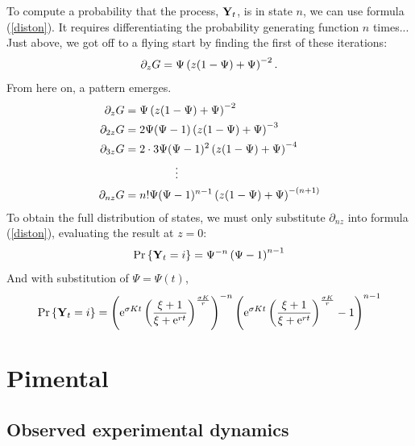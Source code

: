 To compute a probability that the process, ${{\bf Y}_t}$, is in state $n$, we can use formula (\ref{diston}). It requires differentiating the probability generating function $n$ times... Just above, we got off to a flying start by finding the first of these iterations:
$$\partial_z G = \Psi \left( z(1-\Psi) + \Psi\right)^{-2}.$$
From here on, a pattern emerges.
\begin{align*}
\partial_z G &= \Psi \left( z(1-\Psi) + \Psi\right)^{-2}\\
\partial_{2z} G &= 2\Psi (\Psi -1 ) \left( z(1-\Psi) + \Psi\right)^{-3}\\
\partial_{3z} G &= 2\cdot 3\Psi (\Psi -1 )^{2} \left( z(1-\Psi) + \Psi\right)^{-4}\\
&\hspace{45pt}\vdots\\
\partial_{nz} G &= n!\Psi (\Psi -1 )^{n-1} \left( z(1-\Psi) + \Psi\right)^{-(n+1)}
\end{align*}
To obtain the full distribution of states, we must only substitute $\partial_{nz}$ into formula (\ref{diston}), evaluating the result at $z=0$:
$${\text{Pr}\left\{{{\bf Y}_t} = i\right\}} = \Psi^{-n}\left(\Psi- 1\right)^{n-1}$$ 
And with substitution of $\Psi = \Psi(t)$,
$${\text{Pr}\left\{{{\bf Y}_t} = i\right\}} = \left( {\rm e}^{\sigma K t} \left(\frac{\xi + 1}{\xi + {\rm e}^{rt}}\right)^{\frac{\sigma K}{r}}\right)^{-n}\left( {\rm e}^{\sigma K t} \left(\frac{\xi + 1}{\xi + {\rm e}^{rt}}\right)^{\frac{\sigma K}{r}}- 1\right)^{n-1}$$ 
























\section{Pimental}











\subsection*{Observed experimental dynamics}

